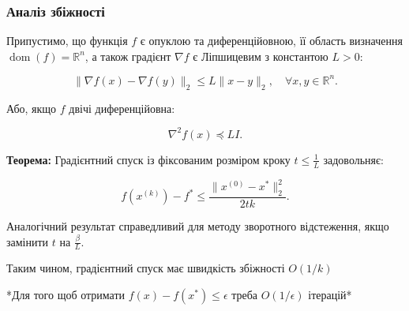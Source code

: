 \documentclass[a4paper,12pt]{article}
\begin{document}
\subsubsection{Аналіз збіжності}

Припустимо, що функція $f$ є опуклою та диференційовною, її область визначення $\operatorname{dom}(f) = \mathbb{R}^n$, а також градієнт $\nabla f$ є Ліпшицевим з константою $L > 0$:

\[
\|\nabla f(x) - \nabla f(y)\|_2 \leq L \|x - y\|_2, \quad \forall x, y \in \mathbb{R}^n.
\]

Або, якщо $f$ двічі диференційовна:

\[
\nabla^2 f(x) \preceq L I.
\]

\textbf{Теорема:} Градієнтний спуск із фіксованим розміром кроку $t \leq \frac{1}{L}$ задовольняє:

\[
f(x^{(k)}) - f^* \leq \frac{\|x^{(0)} - x^*\|_2^2}{2tk}.
\]

Аналогічний результат справедливий для методу зворотного відстеження, якщо замінити $t$ на $\frac{\beta}{L}$.

Таким чином, градієнтний спуск має швидкість збіжності $O(1/k)$

*Для того щоб отримати $f(x) - f(x^*) \leq \epsilon$ треба $O(1/\epsilon)$ ітерацій*
\end{document}
